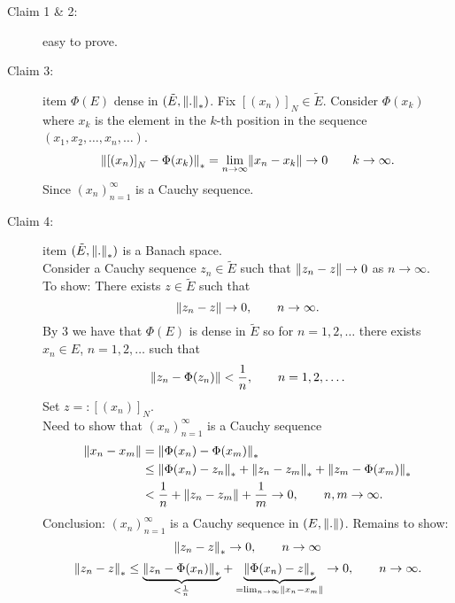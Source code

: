 \begin{description}
\item[Claim 1 \& 2:] easy to prove. 
\item[Claim 3:] item $\Phi(E)$ dense in $(\tilde E,\norm{.}_*)$. Fix $\left[ (x_n) \right]_N \in \tilde E$. Consider $\Phi(x_k)$ where $x_k$ is the element in the $k$-th position in the sequence $(x_1,x_2, \dots,x_n, \dots)$.
\begin{align*}
	\norm{\left[ (x_n) \right]_N - \Phi(x_k)}_* = \lim_{n \to \infty}\norm{x_n - x_k} \to 0 \qquad k \to \infty.
\end{align*}
Since $(x_n)_{n=1}^{\infty}$ is a Cauchy sequence. \\
\item[Claim 4:] item $(\tilde E, \norm{.}_*)$ is a Banach space.\\
Consider a Cauchy sequence $z_n \in \tilde E$ such that $\norm{z_n - z} \to 0$ as $n \to \infty$. \\
To show: There exists $z \in \tilde E$ such that 
\[
	\norm{z_n - z} \to 0, \qquad n \to \infty.
\]
By 3 we have that $\Phi(E)$ is dense in $ \tilde E$ so for $n=1,2,\dots$ there exists $x_n \in E$, $n=1,2,\dots$ such that
\[
	\norm{z_n - \Phi(z_n)} < \frac{1}{n}, \qquad  n=1,2,\dots.
\]
Set $z=: \left[ (x_n) \right]_N$. \\
Need to show that $(x_n)_{n=1}^{\infty}$ is a Cauchy sequence
\begin{align*}
	\norm{x_n - x_m} &= \norm{\Phi(x_n)-\Phi(x_m)}_* \\
	& \leq  \norm{\Phi(x_n)- z_n}_* + \norm{z_n-z_m}_* + \norm{z_m - \Phi(x_m)}_* \\
	&< \frac{1}{n} + \norm{z_n-z_m} + \frac{1}{m} \to 0, \qquad n,m \to \infty.
\end{align*}
Conclusion: $(x_n)_{n=1}^{\infty}$ is a Cauchy sequence in $(E, \norm{.})$. Remains to show:
\[
	\norm{z_n-z}_* \to 0, \qquad n \to \infty
\]
\[
	\norm{z_n - z}_* \leq \underset{< \frac{1}{n}}{\underbrace{\norm{z_n - \Phi(x_n)}_*}} + \underset{= \lim_{n \to \infty}\norm{x_n-x_m}}{\underbrace{\norm{\Phi(x_n)-z}_*}} \to 0, \qquad n \to \infty.
\]
\end{description}

